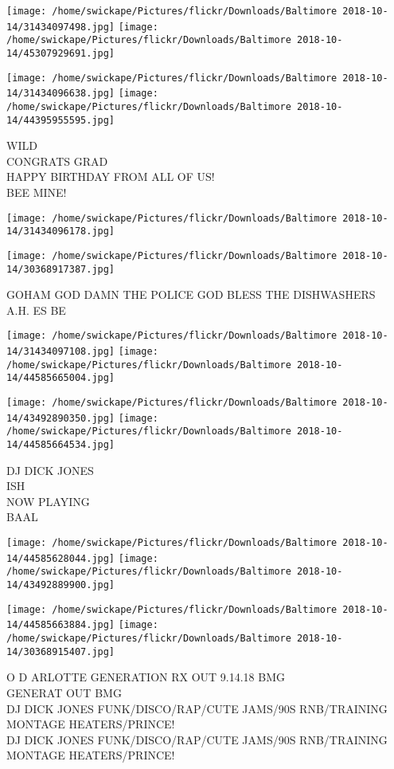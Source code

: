 \documentclass[10pt,letterpaper]{article}
\begin{document}
\texttt{[image: /home/swickape/Pictures/flickr/Downloads/Baltimore 2018-10-14/31434097498.jpg]}
\texttt{[image: /home/swickape/Pictures/flickr/Downloads/Baltimore 2018-10-14/45307929691.jpg]}

\texttt{[image: /home/swickape/Pictures/flickr/Downloads/Baltimore 2018-10-14/31434096638.jpg]}
\texttt{[image: /home/swickape/Pictures/flickr/Downloads/Baltimore 2018-10-14/44395955595.jpg]}

WILD\\
CONGRATS GRAD\\
HAPPY BIRTHDAY FROM ALL OF US!\\
BEE MINE!
\pagebreak

\texttt{[image: /home/swickape/Pictures/flickr/Downloads/Baltimore 2018-10-14/31434096178.jpg]}

\vspace{0.25in}
\texttt{[image: /home/swickape/Pictures/flickr/Downloads/Baltimore 2018-10-14/30368917387.jpg]}

GOHAM GOD DAMN THE POLICE GOD BLESS THE DISHWASHERS\\
A.H. ES BE
\pagebreak

\texttt{[image: /home/swickape/Pictures/flickr/Downloads/Baltimore 2018-10-14/31434097108.jpg]}
\texttt{[image: /home/swickape/Pictures/flickr/Downloads/Baltimore 2018-10-14/44585665004.jpg]}

\texttt{[image: /home/swickape/Pictures/flickr/Downloads/Baltimore 2018-10-14/43492890350.jpg]}
\texttt{[image: /home/swickape/Pictures/flickr/Downloads/Baltimore 2018-10-14/44585664534.jpg]}

DJ DICK JONES\\
ISH\\
NOW PLAYING\\
BAAL
\pagebreak

\texttt{[image: /home/swickape/Pictures/flickr/Downloads/Baltimore 2018-10-14/44585628044.jpg]}
\texttt{[image: /home/swickape/Pictures/flickr/Downloads/Baltimore 2018-10-14/43492889900.jpg]}

\texttt{[image: /home/swickape/Pictures/flickr/Downloads/Baltimore 2018-10-14/44585663884.jpg]}
\texttt{[image: /home/swickape/Pictures/flickr/Downloads/Baltimore 2018-10-14/30368915407.jpg]}

O D ARLOTTE GENERATION RX OUT 9.14.18 BMG\\
GENERAT OUT BMG\\
DJ DICK JONES FUNK/DISCO/RAP/CUTE JAMS/90S RNB/TRAINING MONTAGE HEATERS/PRINCE!\\
DJ DICK JONES FUNK/DISCO/RAP/CUTE JAMS/90S RNB/TRAINING MONTAGE HEATERS/PRINCE!
\pagebreak
\end{document}
